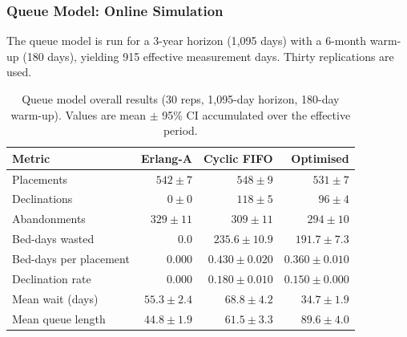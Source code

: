 \subsubsection{Queue Model: Online Simulation}
\label{sec:qm_results}

The queue model is run for a 3-year horizon (1{,}095 days) with a 6-month warm-up
(180 days), yielding 915 effective measurement days.  Thirty replications are used.

\begin{table}[H]
\centering
\caption{Queue model overall results (30 reps, 1{,}095-day horizon, 180-day warm-up).
         Values are mean $\pm$ 95\% CI accumulated over the effective period.}
\label{tab:vch_overall}
\begin{tabular}{lrrr}
\toprule
\textbf{Metric} & \textbf{Erlang-A} & \textbf{Cyclic FIFO} & \textbf{Optimised} \\
\midrule
Placements            & $542 \pm 7$    & $548 \pm 9$      & $531 \pm 7$ \\
Declinations          & $0 \pm 0$      & $118 \pm 5$      & $96 \pm 4$ \\
Abandonments          & $329 \pm 11$   & $309 \pm 11$     & $294 \pm 10$ \\
Bed-days wasted       & $0.0$          & $235.6 \pm 10.9$ & $191.7 \pm 7.3$ \\
Bed-days per placement & $0.000$       & $0.430 \pm 0.020$ & $0.360 \pm 0.010$ \\
Declination rate      & $0.000$        & $0.180 \pm 0.010$ & $0.150 \pm 0.000$ \\
Mean wait (days)      & $55.3 \pm 2.4$ & $68.8 \pm 4.2$   & $34.7 \pm 1.9$ \\
Mean queue length     & $44.8 \pm 1.9$ & $61.5 \pm 3.3$   & $89.6 \pm 4.0$ \\
\bottomrule
\end{tabular}
\end{table}

